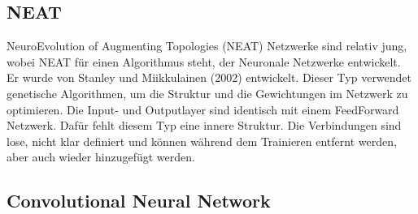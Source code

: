 \subsection{NEAT}

NeuroEvolution of Augmenting Topologies (NEAT) Netzwerke sind relativ jung, wobei NEAT für einen Algorithmus steht, der Neuronale Netzwerke entwickelt.
Er wurde von Stanley und Miikkulainen (2002) entwickelt. 
Dieser Typ verwendet genetische Algorithmen, um die Struktur und die Gewichtungen im Netzwerk zu optimieren.
Die Input- und Outputlayer sind identisch mit einem FeedForward Netzwerk.
Dafür fehlt diesem Typ eine innere Struktur. 
Die Verbindungen sind lose, nicht klar definiert und können während dem Trainieren entfernt werden, aber auch wieder hinzugefügt werden.





\subsection{Convolutional Neural Network}

